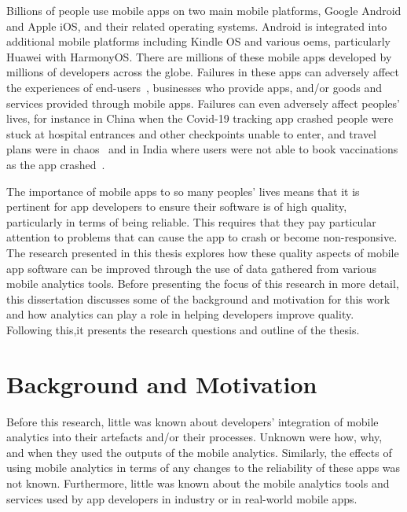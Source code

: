 

Billions of people use mobile apps on two main mobile platforms, Google Android and Apple iOS, and their related operating systems.  Android is integrated into additional mobile platforms including Kindle OS and various \glspl{oem}, particularly Huawei with HarmonyOS. There are millions of these mobile apps developed by millions of developers across the globe. Failures in these apps can adversely affect the experiences of end-users~, businesses who provide apps, and/or goods and services provided through mobile apps. Failures can even adversely affect peoples' lives, for instance in China when the Covid-19 tracking app crashed people were stuck at hospital entrances and other checkpoints unable to enter, and travel plans were in chaos~ and in India where users were not able to book vaccinations as the app crashed~.

The importance of mobile apps to so many peoples' lives means that it is pertinent for app developers to ensure their software is of high quality, particularly in terms of being reliable. This requires that they pay particular attention to problems that can cause the app to crash or become non-responsive. The research presented in this thesis explores how these quality aspects of mobile app software can be improved through the use of data gathered from various mobile analytics tools. Before presenting the focus of this research in more detail, this dissertation discusses some of the background and motivation for this work and how analytics can play a role in helping developers improve quality. Following this,it presents the research questions and outline of the thesis.

\section{Background and Motivation}
Before this research, little was known about developers' integration of mobile analytics into their artefacts and/or their processes. Unknown were how, why, and when they used the outputs of the mobile analytics. Similarly, the effects of using mobile analytics in terms of any changes to the reliability of these apps was not known. Furthermore, little was known about the mobile analytics tools and services used by app developers in industry or in real-world mobile apps.

